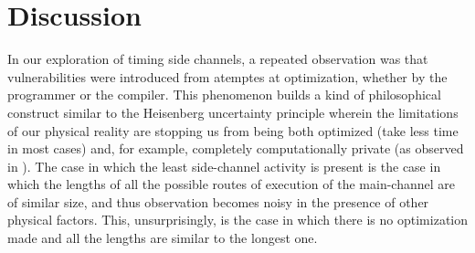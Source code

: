 \section{Discussion}

In our exploration of timing side channels, a repeated observation was that vulnerabilities were introduced from atemptes at optimization, whether by the programmer or the compiler. 
This phenomenon builds a kind of philosophical construct similar to the Heisenberg
uncertainty principle wherein the limitations of our physical reality are stopping
us from being both optimized (take less time in most cases) and, for example, 
completely computationally private (as observed in \cite{archlab-timing-14}). The
case in which the least side-channel activity is present is the case in which the 
lengths of all the possible routes of execution of the main-channel are of similar
size, and thus observation becomes noisy in the presence of other physical factors.
This, unsurprisingly, is the case in which there is no optimization made and all the
lengths are similar to the longest one.



